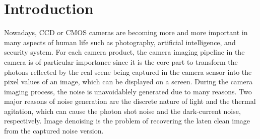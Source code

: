 %
\chapter{Introduction}
\label{sec:intro}



Nowadays, CCD or CMOS cameras are becoming more and more important in many aspects of human life such as photography, artificial intelligence, and security system. For each camera product, the camera imaging pipeline in the camera is of particular importance since it is the core part to transform the photons reflected by the real scene being captured in the camera sensor into the pixel values of an image, which can be displayed on a screen. During the camera imaging process, the noise is unavoidablely generated due to many reasons. Two major reasons of noise generation are the discrete nature of light and the thermal agitation, which can cause the photon shot noise and the dark-current noise, respectively. Image denoising is the problem of recovering the laten clean image from the captured noise version. 




